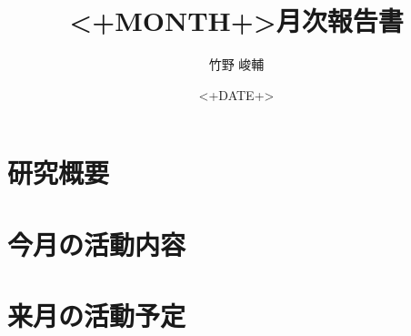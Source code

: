 \documentclass[twocolumn,uplatex]{jsarticle}
\begin{document}
\title{<+MONTH+>月次報告書} 
\author{竹野 峻輔}
\date{<+DATE+>} 
\maketitle

\section{研究概要}

\section{今月の活動内容}

\section{来月の活動予定} 
\end{document}
